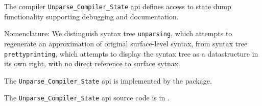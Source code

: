 
The compiler {\tt Unparse\_Compiler\_State} api defines access to state dump functionality 
supporting debugging and documentation.

Nomenclature:  We distinguish syntax tree {\tt unparsing}, which attempts to regenerate an approximation 
of original surface-level syntax, from syntax tree {\tt prettyprinting}, which attempts to display 
the syntax tree as a datastructure in its own right, with no direct reference to surface sytnax.

The {\tt Unparse\_Compiler\_State} api is implemented by the  package.

The {\tt Unparse\_Compiler\_State} api source code is in .

